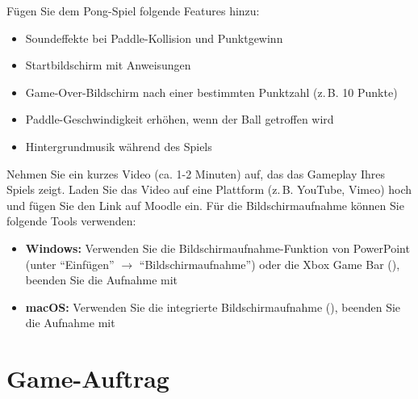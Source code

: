 \begin{mychallenge}
    Fügen Sie dem Pong-Spiel folgende Features hinzu:
    \begin{itemize}
        \item Soundeffekte bei Paddle-Kollision und Punktgewinn
        \item Startbildschirm mit Anweisungen
        \item Game-Over-Bildschirm nach einer bestimmten Punktzahl (z.\,B. 10 Punkte)
        \item Paddle-Geschwindigkeit erhöhen, wenn der Ball getroffen wird
        \item Hintergrundmusik während des Spiels
    \end{itemize}
\end{mychallenge}

\begin{myexercise}
    Nehmen Sie ein kurzes Video (ca. 1-2 Minuten) auf, das das Gameplay Ihres Spiels zeigt. Laden Sie das Video auf eine Plattform (z.\,B. YouTube, Vimeo) hoch und fügen Sie den Link auf Moodle ein. Für die Bildschirmaufnahme können Sie folgende Tools verwenden:

    \begin{itemize}
        \item \textbf{Windows:} Verwenden Sie die Bildschirmaufnahme-Funktion von PowerPoint (unter \enquote{Einfügen} $\rightarrow$ \enquote{Bildschirmaufnahme}) oder die Xbox Game Bar (), beenden Sie die Aufnahme mit 
        \item \textbf{macOS:} Verwenden Sie die integrierte Bildschirmaufnahme (), beenden Sie die Aufnahme mit 
    \end{itemize}



\end{myexercise}

\section{Game-Auftrag}

